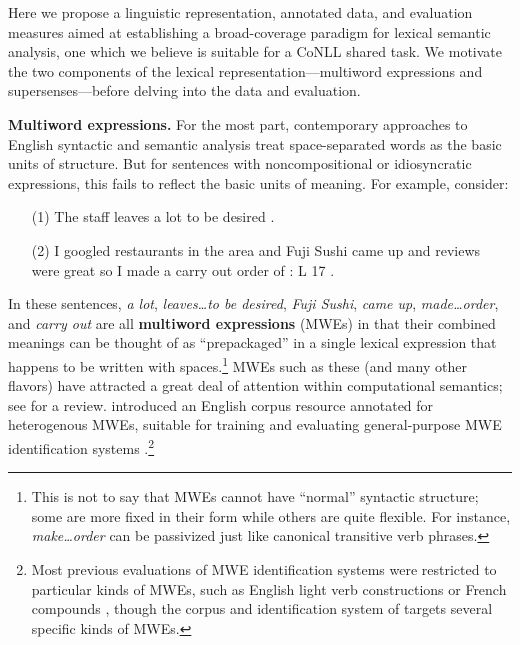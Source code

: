 \documentclass[11pt]{article}
\newcommand{\ensuretext}[1]{#1}
\newcommand{\nssmarker}{\ensuretext{\textcolor{magenta}{\ensuremath{^{\textsc{NS}}_{\textsc{S}}}}}}
\newcommand{\arkcomment}[3]{\ensuretext{\textcolor{#3}{[#1 #2]}}}
\newcommand{\nss}[1]{\arkcomment{\nssmarker}{#1}{magenta}}
\newcommand{\lex}[1]{\textit{#1}} %
\begin{document}
Here we propose a linguistic representation, annotated data, and evaluation measures 
aimed at establishing a broad-coverage paradigm for lexical semantic analysis, 
one which we believe is suitable for a CoNLL shared task. 
We motivate the two components of the lexical representation---multiword expressions 
and supersenses---before delving into the data and evaluation.


\textbf{Multiword expressions.} 
For the most part, contemporary approaches to English syntactic and semantic analysis
treat space-separated words as the basic units of structure. 
But for sentences with noncompositional or idiosyncratic expressions, this fails to reflect 
the basic units of meaning. For example, consider:
\begin{itemize}[labelindent=2em,before=\raggedright]
\item[(1)] The staff leaves a lot to be desired .
\item[(2)] I googled restaurants in the area and Fuji Sushi came up and reviews were great so I made a carry out order of : L 17 .
\end{itemize}
In these sentences, \lex{a lot}, \lex{leaves\ldots to be desired}, 
\lex{Fuji Sushi}, \lex{came up}, \lex{made\ldots order}, and \lex{carry out}
are all \textbf{multiword expressions} (MWEs) 
in that their combined meanings can be thought of as ``prepackaged'' 
in a single lexical expression that happens to be written with spaces.\footnote{This is not to say that MWEs cannot have ``normal'' 
syntactic structure; some are more fixed in their form while others are quite flexible. 
For instance, \lex{make\ldots order} can be passivized just like canonical transitive verb phrases.}
MWEs such as these (and many other flavors) have attracted a great deal of attention 
within computational semantics; see \citet{baldwin-10} for a review.
 introduced an English corpus resource annotated for heterogenous MWEs, 
suitable for training and evaluating general-purpose MWE identification systems \citep{schneider-14}.\footnote{Most 
previous evaluations of MWE identification systems were restricted to 
particular kinds of MWEs, such as English light verb constructions 
or French compounds \citep[recent examples:][]{constant-11,green-12,ramisch-12,vincze-13},
though the corpus and identification system of \citet{vincze-11} targets several specific kinds of MWEs.}
\end{document}
